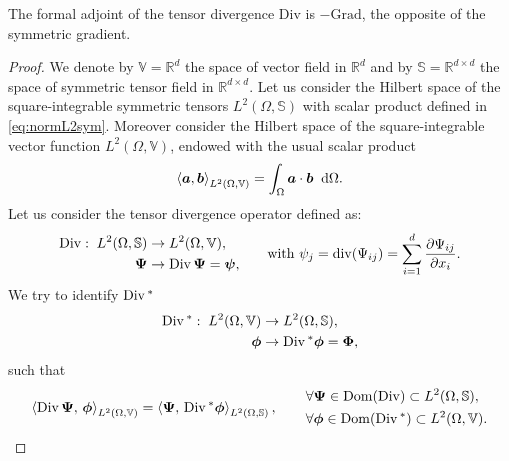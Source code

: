 \begin{theorem}\label{th:adjDiv}
	The formal adjoint of the tensor divergence $\mathrm{Div}$ is $- \mathrm{Grad}$, the opposite of the symmetric gradient.
	\begin{proof}
		We denote by $\mathbb{V} = \mathbb{R}^{d}$ the space of vector field in $\mathbb{R}^{d}$ and by $\mathbb{S} = \mathbb{R}^{d\times d}$ the space of symmetric tensor field in $\mathbb{R}^{d\times d}$. Let us consider the Hilbert space of the square-integrable symmetric tensors $L^2(\Omega, \mathbb{S})$ with scalar product defined in \eqref{eq:normL2sym}. Moreover consider the Hilbert space of the square-integrable vector function $L^2(\Omega, \mathbb{V})$, endowed with the usual scalar product
		\begin{equation*}
		\left\langle \bm{a} , \bm{b} \right\rangle_{L^2(\Omega, \mathbb{V})} = \int_{\Omega}  \bm{a} \cdot \bm{b} \; \d\Omega. 
		\end{equation*}
		Let us consider the tensor divergence operator defined as:
		\begin{equation*}
		\begin{aligned}
		\Div: \; L^2(\Omega, \mathbb{S})& \rightarrow L^2(\Omega, \mathbb{V}), \\
		\bm{\Psi}& \rightarrow \Div\bm{\Psi} = \bm{\psi}, \\
		\end{aligned}
		\qquad \text{with } \psi_j = \mathrm{div}(\Psi_{ij}) = \sum_{i = 1}^d \diffp{\Psi_{ij}}{x_i}.
		\end{equation*}
		We try to identify $\Div{}^*$
		\begin{equation*}
		\begin{aligned}
		\Div{}^*: \; L^2(\Omega, \mathbb{V}) & \rightarrow L^2(\Omega, \mathbb{S}), \\
		\bm{\phi}& \rightarrow  \Div{}^* \bm{\phi} = \bm{\Phi}, \\
		\end{aligned}
		\end{equation*}
		such that \begin{equation*}
		\inner[{L^2(\Omega, \mathbb{V})}]{\Div \bm{\Psi}}{\bm{\phi}}  = \inner[{L^2(\Omega, \mathbb{S})}]{\bm{\Psi}} {\Div{}^* \bm{\phi}},
		\begin{aligned} \qquad
		&\forall \bm{\Psi} \in \Dom(\Div) \subset L^2(\Omega, \mathbb{S}), \\
		&\forall \bm{\phi} \in \Dom(\Div{}^*) \subset L^2(\Omega, \mathbb{V}).
		\end{aligned}
		\end{equation*}

\end{proof}
\end{theorem}
